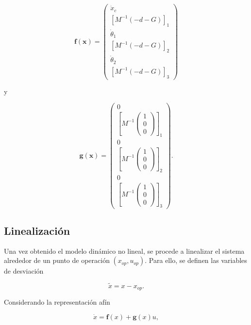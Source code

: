 \documentclass[conference]{IEEEtran}
\begin{document}
\begin{equation}
\mathbf{f}(\mathbf{x})=
\begin{pmatrix}
\dot{x}_c \\
\left[M^{-1}(-d-G)\right]_1 \\
\dot{\theta}_1 \\
\left[M^{-1}(-d-G)\right]_2 \\
\dot{\theta}_2 \\
\left[M^{-1}(-d-G)\right]_3
\end{pmatrix}
\end{equation}

y

\begin{equation}
\mathbf{g}(\mathbf{x})=
\begin{pmatrix}
0 \\
\left[M^{-1}
\begin{pmatrix}
1\\
0\\
0
\end{pmatrix}
\right]_1 \\
0 \\
\left[M^{-1}
\begin{pmatrix}
1\\
0\\
0
\end{pmatrix}
\right]_2 \\
0 \\
\left[M^{-1}
\begin{pmatrix}
1\\
0\\
0
\end{pmatrix}
\right]_3
\end{pmatrix}.
\end{equation}

\subsection{Linealización}

Una vez obtenido el modelo dinámico no lineal, se procede a linealizar el sistema alrededor de un punto de operación
$(x_{op},u_{op})$. Para ello, se definen las variables de desviación

\begin{equation}
\tilde{x}=x-x_{op}.
\end{equation}



Considerando la representación afín

\begin{equation}
\dot{x}=\mathbf{f}(x)+\mathbf{g}(x)u,
\end{equation}
\end{document}
